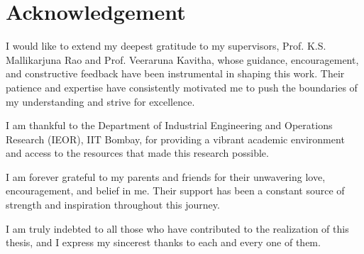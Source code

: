 \section*{\centering Acknowledgement}
\vspace{4mm}
I would like to extend my deepest gratitude to my supervisors, Prof. K.S. Mallikarjuna Rao and Prof. Veeraruna Kavitha, whose guidance, encouragement, and constructive feedback have been instrumental in shaping this work. Their patience and expertise have consistently motivated me to push the boundaries of my understanding and strive for excellence.\vspace{3mm}

\noindent I am thankful to the Department of Industrial Engineering and Operations Research (IEOR), IIT Bombay, for providing a vibrant academic environment and access to the resources that made this research possible.\vspace{3mm}

\noindent I am forever grateful to my parents and friends for their unwavering love, encouragement, and belief in me. Their support has been a constant source of strength and inspiration throughout this journey.\vspace{3mm}

\noindent I am truly indebted to all those who have contributed to the realization of this thesis, and I express my sincerest thanks to each and every one of them.

